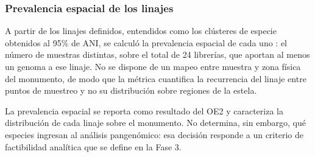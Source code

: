 \begin{table}[H]
\centering

\caption{Matriz de selección de software para la confirmación filogenómica.}
\label{tab:seleccion_filogenomica}

\end{table}

\subsubsection{Prevalencia espacial de los linajes}

A partir de los linajes definidos, entendidos como los clústeres de especie obtenidos al 95\% de ANI, se calculó la prevalencia espacial de cada uno \cite{olm2017}: el número de muestras distintas, sobre el total de 24 librerías, que aportan al menos un genoma a ese linaje. No se dispone de un mapeo entre muestra y zona física del monumento, de modo que la métrica cuantifica la recurrencia del linaje entre puntos de muestreo y no su distribución sobre regiones de la estela.

La prevalencia espacial se reporta como resultado del OE2 y caracteriza la distribución de cada linaje sobre el monumento. No determina, sin embargo, qué especies ingresan al análisis pangenómico: esa decisión responde a un criterio de factibilidad analítica que se define en la Fase 3.

